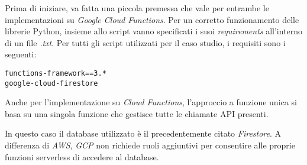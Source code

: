 Prima di iniziare, va fatta una piccola premessa che vale per entrambe le implementazioni su \textit{Google Cloud Functions}. Per un corretto funzionamento delle librerie Python, insieme allo script vanno specificati i suoi \textit{requirements} all'interno di un file \textit{.txt}. Per tutti gli script utilizzati per il caso studio, i requisiti sono i seguenti:
\begin{lstlisting}
functions-framework==3.*
google-cloud-firestore
\end{lstlisting}

Anche per l'implementazione su \textit{Cloud Functions}, l'approccio a funzione unica si basa su una singola funzione che gestisce tutte le chiamate API presenti.

In questo caso il database utilizzato è il precedentemente citato \textit{Firestore}. A differenza di \textit{AWS}, \textit{GCP} non richiede ruoli aggiuntivi per consentire alle proprie funzioni serverless di accedere al database.

